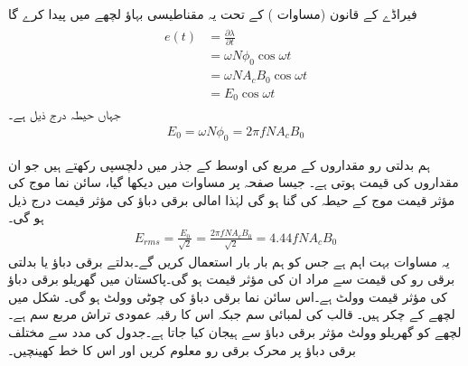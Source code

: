 فیراڈے کے قانون  (مساوات )  کے تحت یہ مقناطیسی بہاؤ  لچھے میں    پیدا کرے گا
\begin{gather}
\begin{aligned}
e(t)&=\frac{\partial \lambda}{\partial t}\\
&=\omega N \phi_0 \cos \omega t \\
&=\omega N A_c B_0 \cos \omega t\\
&=E_0 \cos \omega t
\end{aligned}
\end{gather}
جہاں حیطہ  درج ذیل ہے۔
\begin{align}
E_0=\omega N \phi_0=2 \pi f N A_c B_0
\end{align}

ہم بدلتی  رو مقداروں کے مربع کی اوسط کے جذر  میں دلچسپی رکھتے ہیں جو ان مقداروں کی  قیمت ہوتی ہے۔ جیسا صفحہ  پر مساوات   میں دیکھا گیا،  سائن نما  موج کی مؤثر قیمت موج کے حیطہ کی   گنا ہو گی  لہٰذا امالی برقی دباؤ کی مؤثر قیمت  درج ذیل ہو گی۔
\begin{align}\label{مساوات_مقناطیسی_دور_پیدا_دباو_موثر_قیمت}
E_{rms}=\frac{E_0}{\sqrt{2}}=\frac{2 \pi f N A_c B_0}{\sqrt{2}}=4.44 f N A_c B_0
\end{align}
یہ مساوات بہت اہم ہے  جس کو ہم بار بار استعمال کریں گے۔بدلتے برقی دباؤ یا بدلتی  برقی رو کی قیمت سے مراد ان کی مؤثر  قیمت ہو گی۔پاکستان میں گھریلو برقی دباؤ کی مؤثر قیمت  وولٹ ہے۔اس سائن نما برقی دباؤ کی چوٹی  وولٹ ہو گی۔
%
شکل  میں لچھے کے  چکر ہیں۔ قالب کی لمبائی  سم جبکہ اس کا رقبہ عمودی تراش  مربع سم ہے۔لچھے  کو گھریلو  وولٹ مؤثر برقی دباؤ سے ہیجان  کیا جاتا ہے۔جدول  کی مدد سے مختلف برقی دباؤ پر محرک برقی رو معلوم کریں اور اس کا خط کھینچیں۔

